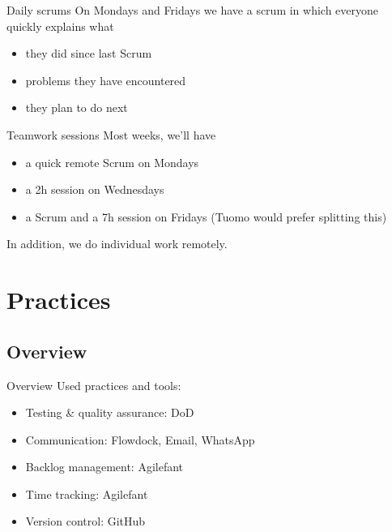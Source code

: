 \documentclass{beamer}
\begin{document}
\begin{frame}{Daily scrums}
  On Mondays and Fridays we have a scrum in which everyone quickly
  explains what
  \begin{itemize}
  \item they did since last Scrum
  \item problems they have encountered
  \item they plan to do next
  \end{itemize}
\end{frame}
\begin{frame}{Teamwork sessions}
  Most weeks, we'll have

  \begin{itemize}
  \item a quick remote Scrum on Mondays
  \item a 2h session on Wednesdays
  \item a Scrum and a 7h session on Fridays (Tuomo would prefer splitting this)
  \end{itemize}

  In addition, we do individual work remotely.
\end{frame}
\section{Practices} %
\subsection{Overview}
\begin{frame}{Overview}
  Used practices and tools:

  \begin{itemize}
  \item Testing \& quality assurance: DoD
  \item Communication: Flowdock, Email, WhatsApp
  \item Backlog management: Agilefant
  \item Time tracking: Agilefant
  \item Version control: GitHub
  \end{itemize}
\end{frame}
\end{document}
